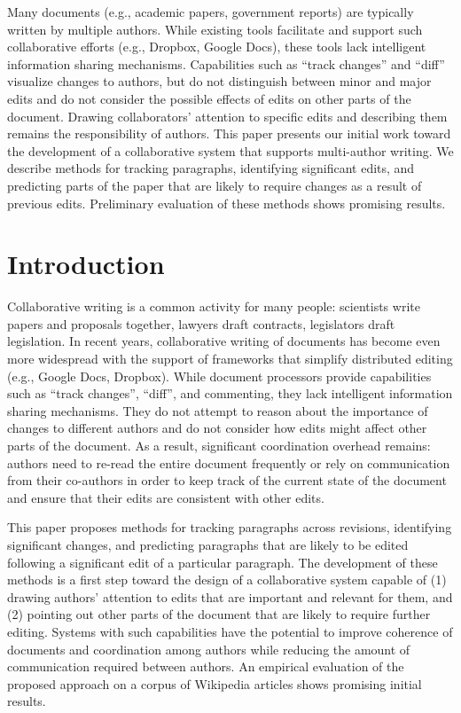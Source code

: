 Many documents (e.g., academic papers, government reports) are typically
written by multiple authors. While existing tools facilitate and support
such collaborative efforts (e.g., Dropbox, Google Docs), these tools
lack intelligent information sharing mechanisms. Capabilities such as
``track changes'' and ``diff'' visualize changes to authors, but do not
distinguish between minor and major edits and do not consider the
possible effects of edits on other parts of the document. Drawing
collaborators' attention to specific edits and describing them remains
the responsibility of authors. This paper presents our initial work
toward the development of a collaborative system that supports
multi-author writing. We describe methods for tracking paragraphs,
identifying significant edits, and predicting parts of the paper that
are likely to require changes as a result of previous edits. Preliminary
evaluation of these methods shows promising results.

\section{Introduction}\label{introduction}

Collaborative writing is a common activity for many people: scientists
write papers and proposals together, lawyers draft contracts,
legislators draft legislation. In recent years, collaborative writing of
documents has become even more widespread with the support of frameworks
that simplify distributed editing (e.g., Google Docs, Dropbox). While
document processors provide capabilities such as ``track changes'',
``diff'', and commenting, they lack intelligent information sharing
mechanisms. They do not attempt to reason about the importance of
changes to different authors and do not consider how edits might affect
other parts of the document. As a result, significant coordination
overhead remains: authors need to re-read the entire document frequently
or rely on communication from their co-authors in order to keep track of
the current state of the document and ensure that their edits are
consistent with other edits.

This paper proposes methods for tracking paragraphs across revisions,
identifying significant changes, and predicting paragraphs that are
likely to be edited following a significant edit of a particular
paragraph. The development of these methods is a first step toward the
design of a collaborative system capable of (1) drawing authors'
attention to edits that are important and relevant for them, and (2)
pointing out other parts of the document that are likely to require
further editing. Systems with such capabilities have the potential to
improve coherence of documents and coordination among authors while
reducing the amount of communication required between authors. An
empirical evaluation of the proposed approach on a corpus of Wikipedia
articles shows promising initial results.

